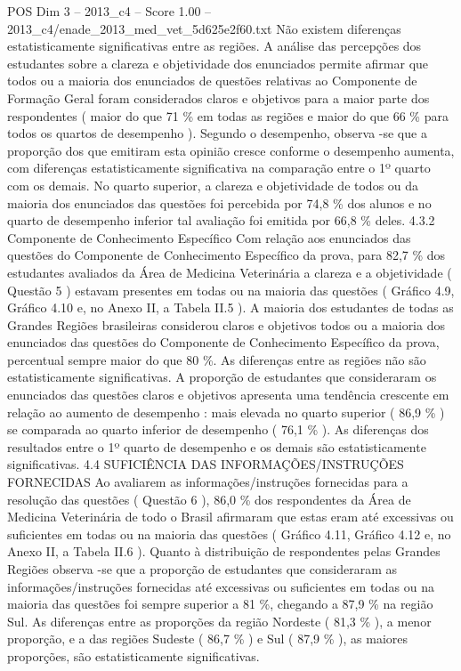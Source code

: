 \begin{textsample}{POS Dim 3 – 2013\_c4 – Score 1.00 – 2013\_c4/enade\_2013\_med\_vet\_5d625e2f60.txt}
Não existem diferenças estatisticamente significativas entre as regiões.
A análise das percepções dos estudantes sobre a clareza e objetividade dos enunciados permite afirmar que todos ou a maioria dos enunciados de questões relativas ao Componente de Formação Geral foram considerados claros e objetivos para a maior parte dos respondentes ( maior do que 71 \% em todas as regiões e maior do que 66 \% para todos os quartos de desempenho ).
Segundo o desempenho, observa -se que a proporção dos que emitiram esta opinião cresce conforme o desempenho aumenta, com diferenças estatisticamente significativa na comparação entre o 1º quarto com os demais.
No quarto superior, a clareza e objetividade de todos ou da maioria dos enunciados das questões foi percebida por 74,8 \% dos alunos e no quarto de desempenho inferior tal avaliação foi emitida por 66,8 \% deles. 4.3.2 Componente de Conhecimento Específico Com relação aos enunciados das questões do Componente de Conhecimento Específico da prova, para 82,7 \% dos estudantes avaliados da Área de Medicina Veterinária a clareza e a objetividade ( Questão 5 ) estavam presentes em todas ou na maioria das questões ( Gráfico 4.9, Gráfico 4.10 e, no Anexo II, a Tabela II.5 ).
A maioria dos estudantes de todas as Grandes Regiões brasileiras considerou claros e objetivos todos ou a maioria dos enunciados das questões do Componente de Conhecimento Específico da prova, percentual sempre maior do que 80 \%.
As diferenças entre as regiões não são estatisticamente significativas.
A proporção de estudantes que consideraram os enunciados das questões claros e objetivos apresenta uma tendência crescente em relação ao aumento de desempenho : mais elevada no quarto superior ( 86,9 \% ) se comparada ao quarto inferior de desempenho ( 76,1 \% ).
As diferenças dos resultados entre o 1º quarto de desempenho e os demais são estatisticamente significativas. 4.4 SUFICIÊNCIA DAS INFORMAÇÕES/INSTRUÇÕES FORNECIDAS Ao avaliarem as informações/instruções fornecidas para a resolução das questões ( Questão 6 ), 86,0 \% dos respondentes da Área de Medicina Veterinária de todo o Brasil afirmaram que estas eram até excessivas ou suficientes em todas ou na maioria das questões ( Gráfico 4.11, Gráfico 4.12 e, no Anexo II, a Tabela II.6 ).
Quanto à distribuição de respondentes pelas Grandes Regiões observa -se que a proporção de estudantes que consideraram as informações/instruções fornecidas até excessivas ou suficientes em todas ou na maioria das questões foi sempre superior a 81 \%, chegando a 87,9 \% na região Sul.
As diferenças entre as proporções da região Nordeste ( 81,3 \% ), a menor proporção, e a das regiões Sudeste ( 86,7 \% ) e Sul ( 87,9 \% ), as maiores proporções, são estatisticamente significativas.

\end{textsample}
